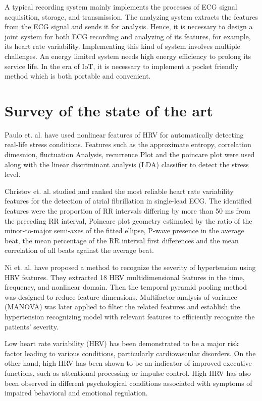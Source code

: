 \documentclass[11pt]{article}
\theoremstyle{definition}
\begin{document}
  A typical recording system mainly implements the processes of ECG signal acquisition, storage, and transmission.
  The analyzing system extracts the features from the ECG signal and sends it for analysis.
  Hence, it is necessary to design a joint system for both ECG recording and analyzing of its features, for example, its heart rate variability. Implementing this kind of system involves multiple challenges.
  An energy limited system needs high energy efficiency to prolong its service life.
  In the era of IoT, it is necessary to implement a pocket friendly method which is both portable and convenient.


  \section{Survey of the state of the art}
  Paulo et. al.\cite{melillo2011nonlinear} have used nonlinear features of HRV for automatically detecting real-life stress conditions. Features such as the approximate entropy, correlation dimesnion, fluctuation Analysis, recurrence Plot and the poincare plot were used along with the linear discriminant analysis (LDA) classifier to detect the stress level.

  Christov et. al. \cite{christov2018ranking} studied and ranked the most reliable heart rate variability features for the detection of atrial fibrillation in single-lead ECG. The identified features were the proportion of RR intervals differing by more than 50 ms from the preceding RR interval, Poincare plot geometry estimated by the ratio of the minor-to-major semi-axes of the fitted ellipse, P-wave presence in the average beat, the mean percentage of the RR interval first differences and the mean correlation of all beats against the average beat.

  Ni et. al.\cite{ni2019multiscale} have proposed a method to recognize the severity of hypertension using HRV features. They extracted 18 HRV multidimensional features in the time, frequency, and nonlinear domain. Then the temporal pyramid pooling method was designed to reduce feature dimensions. Multifactor analysis of variance (MANOVA) was later applied to filter the related features and establish the hypertension recognizing model with relevant features to efficiently recognize the patients’ severity.

  Low heart rate variability (HRV) has been demonstrated to be a major risk factor leading to various conditions, particularly cardiovascular disorders\cite{kamath1987heart}.
  On the other hand, high HRV has been shown to be an indicator of improved executive functions, such as attentional processing or impulse control\cite{appelhans2006heart, thayer2005psychosomatics}.
  High HRV has also been observed in different psychological conditions associated with symptoms of impaired behavioral and emotional regulation\cite{thayer2009claude, schulz2008negative}.
\end{document}

